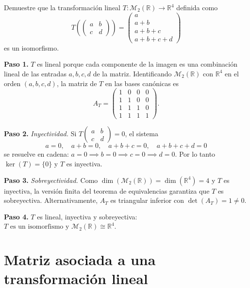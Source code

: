 \begin{example}\label{ex:tl_isomorfismo_m2}
Demuestre que la transformación lineal $T:\mathcal{M}_{2}(\mathbb{R}) \rightarrow \mathbb{R}^{4}$ definida como
\[
T\left(
\begin{pmatrix}
a & b \\
c & d
\end{pmatrix}
\right) =
\begin{pmatrix}
a \\
a+b \\
a+b+c \\
a+b+c+d
\end{pmatrix}
\]
es un isomorfismo.
\begin{myproof}
\textbf{Paso 1.} $T$ es lineal porque cada componente de la imagen es una combinación lineal de las entradas $a, b, c, d$ de la matriz. Identificando $\mathcal{M}_2(\mathbb{R})$ con $\mathbb{R}^4$ en el orden $(a, b, c, d)$, la matriz de $T$ en las bases canónicas es
\[
A_T =
\begin{pmatrix}
1 & 0 & 0 & 0 \\
1 & 1 & 0 & 0 \\
1 & 1 & 1 & 0 \\
1 & 1 & 1 & 1
\end{pmatrix}.
\]

\textbf{Paso 2.} \emph{Inyectividad.} Si $T\begin{pmatrix} a & b \\ c & d \end{pmatrix} = 0$, el sistema
\[
a = 0, \quad a + b = 0, \quad a + b + c = 0, \quad a + b + c + d = 0
\]
se resuelve en cadena: $a = 0 \implies b = 0 \implies c = 0 \implies d = 0$. Por lo tanto $\ker(T) = \{0\}$ y $T$ es inyectiva.

\textbf{Paso 3.} \emph{Sobreyectividad.} Como $\dim(\mathcal{M}_2(\mathbb{R})) = \dim(\mathbb{R}^4) = 4$ y $T$ es inyectiva, la versión finita del teorema de equivalencias garantiza que $T$ es sobreyectiva. Alternativamente, $A_T$ es triangular inferior con $\det(A_T) = 1 \neq 0$.

\textbf{Paso 4.} $T$ es lineal, inyectiva y sobreyectiva: $\boxed{T \text{ es un isomorfismo y } \mathcal{M}_2(\mathbb{R}) \cong \mathbb{R}^4}$.
\end{myproof}
\end{example}

\section{Matriz asociada a una transformación lineal}

